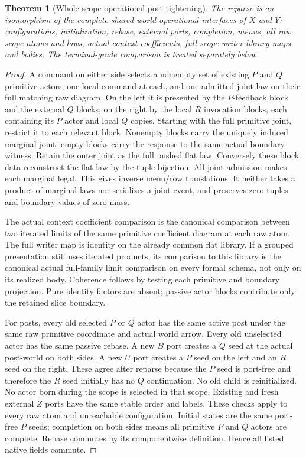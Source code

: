 \documentclass[11pt]{article}
\newtheorem{theorem}{Theorem}\newtheorem{proposition}[theorem]{Proposition}
\begin{document}
\begin{theorem}[Whole-scope operational post-tightening]
The reparse is an isomorphism of the complete shared-world operational interfaces of $X$ and $Y$: configurations, initialization, rebase, external ports, completion, menus, all raw scope atoms and laws, actual context coefficients, full scope writer-library maps and bodies. The terminal-grade comparison is treated separately below.
\end{theorem}
\begin{proof}
A command on either side selects a nonempty set of existing $P$ and $Q$ primitive actors, one local command at each, and one admitted joint law on their full matching raw diagram. On the left it is presented by the $P$-feedback block and the external $Q$ blocks; on the right by the local $R$ invocation blocks, each containing its $P$ actor and local $Q$ copies. Starting with the full primitive joint, restrict it to each relevant block. Nonempty blocks carry the uniquely induced marginal joint; empty blocks carry the response to the same actual boundary witness. Retain the outer joint as the full pushed flat law. Conversely these block data reconstruct the flat law by the tuple bijection. All-joint admission makes each marginal legal. This gives inverse menu/row translations. It neither takes a product of marginal laws nor serializes a joint event, and preserves zero tuples and boundary values of zero mass.

The actual context coefficient comparison is the canonical comparison between two iterated limits of the same primitive coefficient diagram at each raw atom. The full writer map is identity on the already common flat library. If a grouped presentation still uses iterated products, its comparison to this library is the canonical actual full-family limit comparison on every formal schema, not only on its realized body. Coherence follows by testing each primitive and boundary projection. Pure identity factors are absent; passive actor blocks contribute only the retained slice boundary.

For posts, every old selected $P$ or $Q$ actor has the same active post under the same raw primitive coordinate and actual world arrow. Every old unselected actor has the same passive rebase. A new $B$ port creates a $Q$ seed at the actual post-world on both sides. A new $U$ port creates a $P$ seed on the left and an $R$ seed on the right. These agree after reparse because the $P$ seed is port-free and therefore the $R$ seed initially has no $Q$ continuation. No old child is reinitialized. No actor born during the scope is selected in that scope. Existing and fresh external $Z$ ports have the same stable order and labels. These checks apply to every raw atom and unreachable configuration. Initial states are the same port-free $P$ seeds; completion on both sides means all primitive $P$ and $Q$ actors are complete. Rebase commutes by its componentwise definition. Hence all listed native fields commute.
\end{proof}
\end{document}
